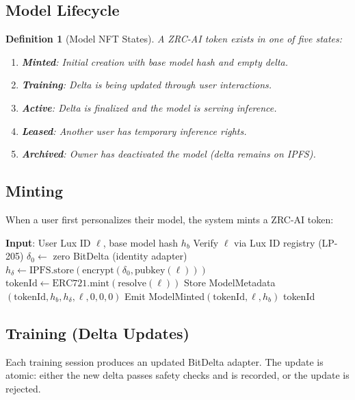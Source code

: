 \documentclass[11pt,letterpaper]{article}
\newtheorem{definition}{Definition}[section]
\begin{document}
\subsection{Model Lifecycle}

\begin{definition}[Model NFT States]
A ZRC-AI token exists in one of five states:
\begin{enumerate}
    \item \textbf{Minted}: Initial creation with base model hash and empty delta.
    \item \textbf{Training}: Delta is being updated through user interactions.
    \item \textbf{Active}: Delta is finalized and the model is serving inference.
    \item \textbf{Leased}: Another user has temporary inference rights.
    \item \textbf{Archived}: Owner has deactivated the model (delta remains on IPFS).
\end{enumerate}
\end{definition}

\subsection{Minting}

When a user first personalizes their model, the system mints a ZRC-AI token:

\begin{algorithm}[t]
\caption{ZRC-AI Minting}
\label{alg:mint}
\begin{algorithmic}[1]
\STATE \textbf{Input}: User Lux ID $\ell$, base model hash $h_b$
\STATE Verify $\ell$ via Lux ID registry (LP-205)
\STATE $\delta_0 \leftarrow$ zero BitDelta (identity adapter)
\STATE $h_\delta \leftarrow \text{IPFS.store}(\text{encrypt}(\delta_0, \text{pubkey}(\ell)))$
\STATE $\text{tokenId} \leftarrow \text{ERC721.mint}(\text{resolve}(\ell))$
\STATE Store ModelMetadata$(\text{tokenId}, h_b, h_\delta, \ell, 0, 0, 0)$
\STATE Emit ModelMinted$(\text{tokenId}, \ell, h_b)$
\RETURN tokenId
\end{algorithmic}
\end{algorithm}

\subsection{Training (Delta Updates)}

Each training session produces an updated BitDelta adapter. The update is atomic: either the new delta passes safety checks and is recorded, or the update is rejected.
\end{document}
